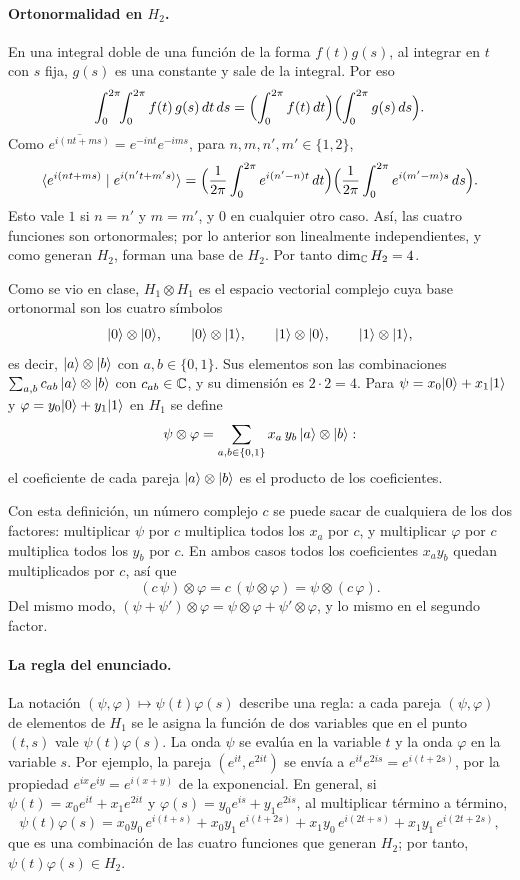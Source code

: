 \paragraph{Ortonormalidad en $H_2$.} En una integral doble de una función de la forma $f(t)g(s)$, al integrar en $t$ con $s$ fija, $g(s)$ es una constante y sale de la integral. Por eso
\[
  \int_0^{2\pi}\!\!\int_0^{2\pi}f(t)\,g(s)\,dt\,ds=\Bigl(\int_0^{2\pi}f(t)\,dt\Bigr)\Bigl(\int_0^{2\pi}g(s)\,ds\Bigr).
\]
Como $\overline{e^{i(nt+ms)}}=e^{-int}e^{-ims}$, para $n,m,n',m'\in\{1,2\}$,
\[
  \langle e^{i(nt+ms)}\mid e^{i(n't+m's)}\rangle=\Bigl(\frac1{2\pi}\int_0^{2\pi}e^{i(n'-n)t}\,dt\Bigr)\Bigl(\frac1{2\pi}\int_0^{2\pi}e^{i(m'-m)s}\,ds\Bigr).
\]
Esto vale $1$ si $n=n'$ y $m=m'$, y $0$ en cualquier otro caso. Así, las cuatro funciones son ortonormales; por lo anterior son linealmente independientes, y como generan $H_2$, forman una base de $H_2$. Por tanto $\dim_{\mathbb{C}}H_2=4$.

\begin{definicionT}
Como se vio en clase, $H_1\otimes H_1$ es el espacio vectorial complejo cuya base ortonormal son los cuatro símbolos
\[
  \lvert 0\rangle\otimes\lvert 0\rangle,\qquad \lvert 0\rangle\otimes\lvert 1\rangle,\qquad \lvert 1\rangle\otimes\lvert 0\rangle,\qquad \lvert 1\rangle\otimes\lvert 1\rangle ,
\]
es decir, $\lvert a\rangle\otimes\lvert b\rangle$ con $a,b\in\{0,1\}$. Sus elementos son las combinaciones $\sum_{a,b}c_{ab}\,\lvert a\rangle\otimes\lvert b\rangle$ con $c_{ab}\in\mathbb{C}$, y su dimensión es $2\cdot2=4$. Para $\psi=x_0\lvert 0\rangle+x_1\lvert 1\rangle$ y $\varphi=y_0\lvert 0\rangle+y_1\lvert 1\rangle$ en $H_1$ se define
\[
  \psi\otimes\varphi=\sum_{a,b\in\{0,1\}}x_a\,y_b\,\lvert a\rangle\otimes\lvert b\rangle :
\]
el coeficiente de cada pareja $\lvert a\rangle\otimes\lvert b\rangle$ es el producto de los coeficientes.
\end{definicionT}

Con esta definición, un número complejo $c$ se puede sacar de cualquiera de los dos factores: multiplicar $\psi$ por $c$ multiplica todos los $x_a$ por $c$, y multiplicar $\varphi$ por $c$ multiplica todos los $y_b$ por $c$. En ambos casos todos los coeficientes $x_ay_b$ quedan multiplicados por $c$, así que
\[
  (c\,\psi)\otimes\varphi=c\,(\psi\otimes\varphi)=\psi\otimes(c\,\varphi).
\]
Del mismo modo, $(\psi+\psi')\otimes\varphi=\psi\otimes\varphi+\psi'\otimes\varphi$, y lo mismo en el segundo factor.

\paragraph{La regla del enunciado.} La notación $(\psi,\varphi)\mapsto\psi(t)\varphi(s)$ describe una regla: a cada pareja $(\psi,\varphi)$ de elementos de $H_1$ se le asigna la función de dos variables que en el punto $(t,s)$ vale $\psi(t)\varphi(s)$. La onda $\psi$ se evalúa en la variable $t$ y la onda $\varphi$ en la variable $s$. Por ejemplo, la pareja $(e^{it},e^{2it})$ se envía a $e^{it}e^{2is}=e^{i(t+2s)}$, por la propiedad $e^{ix}e^{iy}=e^{i(x+y)}$ de la exponencial. En general, si $\psi(t)=x_0e^{it}+x_1e^{2it}$ y $\varphi(s)=y_0e^{is}+y_1e^{2is}$, al multiplicar término a término,
\[
  \psi(t)\varphi(s)=x_0y_0\,e^{i(t+s)}+x_0y_1\,e^{i(t+2s)}+x_1y_0\,e^{i(2t+s)}+x_1y_1\,e^{i(2t+2s)},
\]
que es una combinación de las cuatro funciones que generan $H_2$; por tanto, $\psi(t)\varphi(s)\in H_2$.

